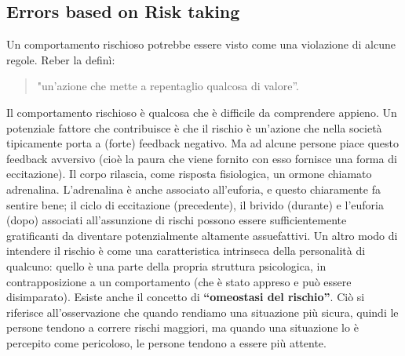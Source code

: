 \documentclass[11pt]{article}
\theoremstyle{definition} \newtheorem{definizione}{Definizione}[section] %
\begin{document}
    \subsection{Errors based on Risk taking}
    Un comportamento rischioso potrebbe essere visto come una violazione di alcune regole. 
    Reber la definì: 
    \begin{quote}
    "un'azione che mette a repentaglio qualcosa di valore”. 
    \end{quote}
    Il comportamento rischioso è qualcosa che è difficile da comprendere appieno. Un potenziale fattore che contribuisce è che il rischio è un’azione che nella società tipicamente porta a (forte) feedback negativo. 
    Ma ad alcune persone piace questo feedback avversivo (cioè la paura che viene fornito con esso fornisce una forma di eccitazione).
    Il corpo rilascia, come risposta fisiologica, un ormone chiamato adrenalina. L'adrenalina è anche associato all'euforia, e questo chiaramente fa sentire bene; 
    il ciclo di eccitazione (precedente), il brivido (durante) e l'euforia (dopo) associati all'assunzione di rischi possono essere sufficientemente gratificanti da diventare potenzialmente altamente assuefattivi.
    Un altro modo di intendere il rischio è come una caratteristica intrinseca della personalità di qualcuno: quello è una parte della propria struttura psicologica, in contrapposizione a un comportamento (che è stato appreso e può essere disimparato).
    Esiste anche il concetto di \textbf{“omeostasi del rischio”}. Ciò si riferisce all'osservazione che quando rendiamo una situazione più sicura, quindi le persone tendono a correre rischi maggiori, ma quando una situazione lo è percepito come pericoloso, le persone tendono a essere più attente.
    
\end{document}
